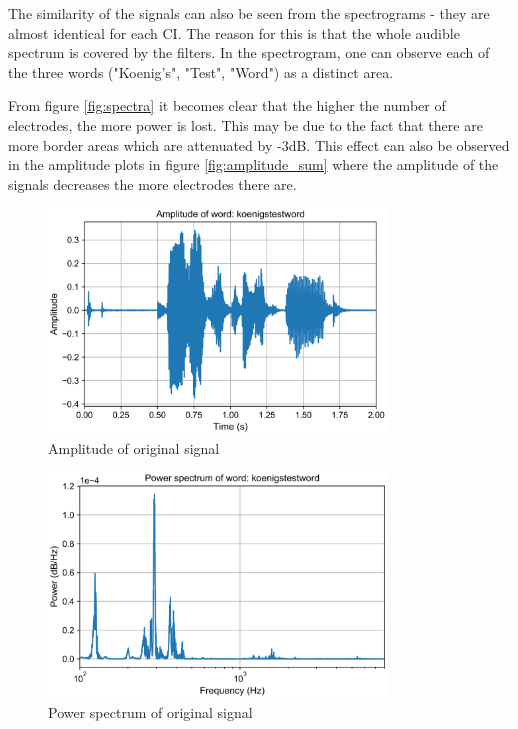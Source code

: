 \documentclass{scrartcl}
\begin{document}
The similarity of the signals can also be seen from the spectrograms - they are almost identical for each CI. The reason for this is that the whole audible spectrum is covered by the filters. In the spectrogram, one can observe each of the three words ("Koenig's", "Test", "Word") as a distinct area. 

From figure \ref{fig:spectra} it becomes clear that the higher the number of electrodes, the more power is lost. This may be due to the fact that there are more border areas which are attenuated by -3dB. This effect can also be observed in the amplitude plots in figure \ref{fig:amplitude_sum} where the amplitude of the signals decreases the more electrodes there are.

\begin{figure}[h]
	\centering
	\includegraphics[width=0.8\textwidth]{figures/amplitude_koenigstestword}
	\caption{Amplitude of original signal}
	\label{fig:amplitude_koenigstestword}
\end{figure}
\begin{figure}[h]
	\centering
	\includegraphics[width=0.8\textwidth]{figures/spectrum_koenigstestword}
	\caption{Power spectrum of original signal}
	\label{fig:spectrum_koenigstestword}
\end{figure}
\end{document}

